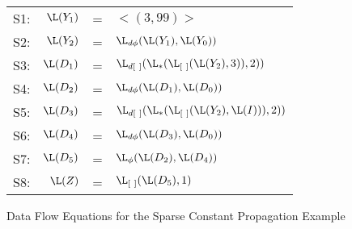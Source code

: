\begin{figure}%
\begin{center}
\begin{tabular}{r r c l}
\mbox{S1:} & $\L(Y_1)$ & = & $<(3,99)>$ \\
\mbox{S2:} & $\L(Y_2)$ & = & $\L_{d\phi} (\L(Y_1), \L(Y_0))$ \\
\mbox{S3:} & $\L(D_1)$ & = & $\L_{d[\ ]}(\L_*(\L_{[\ ]}(\L(Y_2),3)), 2))$ \\
\mbox{S4:} & $\L(D_2)$ & = & $\L_{d\phi} (\L(D_1), \L(D_0))$ \\
\mbox{S5:} & $\L(D_3)$ & = & $\L_{d[\ ]}(\L_*(
\L_{[\ ]}(\L(Y_2),\L(I)))
, 2))$ \\
\mbox{S6:} & $\L(D_4)$ & = & $\L_{d\phi} (\L(D_3), \L(D_0))$ \\
\mbox{S7:} & $\L(D_5)$ & = & $\L_{\phi}(\L(D_2),\L(D_4))$ \\
\mbox{S8:} & $\L(Z)$ & =  & $\L_{[\ ]}(\L(D_5), 1)$
\end{tabular}
\end{center}
\caption{Data Flow Equations for the Sparse Constant Propagation Example}
\label{fig:sc-ex-df}
\end{figure}


